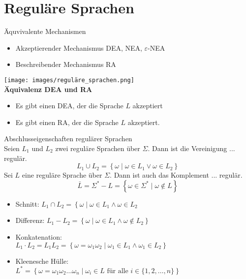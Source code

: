 \graphicspath{{images/}}
\section*{Reguläre Sprachen}

\begin{concept}{Äquvivalente Mechanismen}\\
    \begin{itemize}
        \item Akzeptierender Mechanismus DEA, NEA, $\varepsilon$-NEA
        \item Beschreibender Mechanismus RA
    \end{itemize}
      \texttt{[image: images/reguläre\_sprachen.png]}\\
    \textbf{Äquivalenz DEA und RA}
    \begin{itemize}
    \item Es gibt einen DEA, der die Sprache $L$ akzeptiert
    \item Es gibt einen RA, der die Sprache $L$ akzeptiert.
    \end{itemize}
\end{concept}

\begin{theorem}{Abschlusseigenschaften regulärer Sprachen}\\
    Seien $L_{1}$ und $L_{2}$ zwei reguläre Sprachen über $\Sigma$. Dann ist die Vereinigung ... regulär.
    $$
    L_{1} \cup L_{2}=\left\{\omega \mid \omega \in L_{1} \vee \omega \in L_{2}\right\}
    $$
    Sei $L$ eine reguläre Sprache über $\Sigma$. Dann ist auch das Komplement ... regulär.
    $$
    \bar{L}=\Sigma^{*}-L=\left\{\omega \in \Sigma^{*} \mid \omega \notin L\right\}
    $$
    \begin{itemize}
        \item Schnitt: $L_{1} \cap L_{2}=\left\{\omega \mid \omega \in L_{1} \wedge \omega \in L_{2}\right.$
        \item Differenz: $L_{1}-L_{2}=\left\{\omega \mid \omega \in L_{1} \wedge \omega \notin L_{2}\right\}$
        \item Konkatenation:\\
        $L_{1} \cdot L_{2}=L_{1} L_{2}=\left\{\omega=\omega_{1} \omega_{2} \mid \omega_{1} \in L_{1} \wedge \omega_{1} \in L_{2}\right\}$
        \item Kleenesche Hülle:\\ 
        $L^{*}=\left\{\omega=\omega_{1} \omega_{2} \ldots \omega_{n} \mid \omega_{i} \in L \text { für alle } i \in\{1,2, \ldots, n\}\right\}$
    \end{itemize}
\end{theorem}

